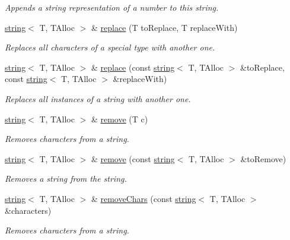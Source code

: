\begin{DoxyCompactItemize}
\begin{DoxyCompactList}\small\item\em Appends a string representation of a number to this string. \end{DoxyCompactList}\item 
\hyperlink{classirr_1_1core_1_1string}{string}$<$ T, T\+Alloc $>$ \& \hyperlink{classirr_1_1core_1_1string_a8f9ea924e6293d9763d8cf404744631a}{replace} (T to\+Replace, T replace\+With)
\begin{DoxyCompactList}\small\item\em Replaces all characters of a special type with another one. \end{DoxyCompactList}\item 
\hyperlink{classirr_1_1core_1_1string}{string}$<$ T, T\+Alloc $>$ \& \hyperlink{classirr_1_1core_1_1string_a3c61ab1df9457e703893c02c52b6bca0}{replace} (const \hyperlink{classirr_1_1core_1_1string}{string}$<$ T, T\+Alloc $>$ \&to\+Replace, const \hyperlink{classirr_1_1core_1_1string}{string}$<$ T, T\+Alloc $>$ \&replace\+With)
\begin{DoxyCompactList}\small\item\em Replaces all instances of a string with another one. \end{DoxyCompactList}\item 
\hyperlink{classirr_1_1core_1_1string}{string}$<$ T, T\+Alloc $>$ \& \hyperlink{classirr_1_1core_1_1string_a53f381cdc030a5482af5d031cba3f745}{remove} (T c)
\begin{DoxyCompactList}\small\item\em Removes characters from a string. \end{DoxyCompactList}\item 
\hyperlink{classirr_1_1core_1_1string}{string}$<$ T, T\+Alloc $>$ \& \hyperlink{classirr_1_1core_1_1string_a2eacbde99201c8dcecb0f3123d53b42a}{remove} (const \hyperlink{classirr_1_1core_1_1string}{string}$<$ T, T\+Alloc $>$ \&to\+Remove)
\begin{DoxyCompactList}\small\item\em Removes a string from the string. \end{DoxyCompactList}\item 
\hyperlink{classirr_1_1core_1_1string}{string}$<$ T, T\+Alloc $>$ \& \hyperlink{classirr_1_1core_1_1string_a01cf7cf4bd204d0dd15b447b5e7c8027}{remove\+Chars} (const \hyperlink{classirr_1_1core_1_1string}{string}$<$ T, T\+Alloc $>$ \&characters)
\begin{DoxyCompactList}\small\item\em Removes characters from a string. \end{DoxyCompactList}\item 

\end{DoxyCompactItemize}
